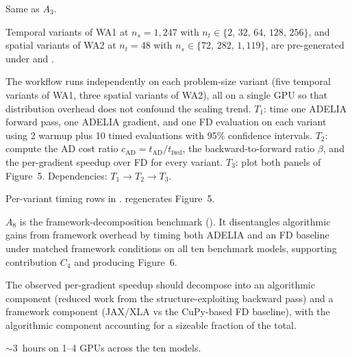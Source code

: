 \documentclass[nonacm,sigconf]{acmart}
\begin{document}
\artin


Same as $A_3$.


Temporal variants of WA1 at $n_s{=}1{,}247$
with $n_t \in \{2,\,32,\,64,\,128,\,256\}$,
and spatial variants of WA2 at $n_t{=}48$
with $n_s \in \{72,\,282,\,1{,}119\}$,
are pre-generated under 
and .

\artcomp

The workflow runs independently on each problem-size variant
(five temporal variants of WA1, three spatial variants of WA2),
all on a single GPU so that distribution overhead does not
confound the scaling trend.
$T_1$: time one ADELIA forward pass, one ADELIA gradient, and
one FD evaluation on each variant using 2 warmup plus 10 timed
evaluations with 95\% confidence intervals.
$T_2$: compute the AD cost ratio
$c_{\mathrm{AD}} = t_{\mathrm{AD}} / t_{\mathrm{fwd}}$, the
backward-to-forward ratio $\beta$, and the per-gradient speedup
over FD for every variant.
$T_3$: plot both panels of Figure~5.
Dependencies: $T_1 \rightarrow T_2 \rightarrow T_3$.

\artout

Per-variant timing rows in .
 regenerates Figure~5.


\newartifact

\artrel

$A_8$ is the framework-decomposition benchmark
(). It
disentangles algorithmic gains from framework overhead by timing
both ADELIA and an FD baseline under matched framework conditions
on all ten benchmark models, supporting contribution $C_4$ and
producing Figure~6.

\artexp

The observed per-gradient speedup should decompose into an
algorithmic component (reduced work from the structure-exploiting
backward pass) and a framework component (JAX/XLA vs the CuPy-based
FD baseline), with the algorithmic component accounting for a
sizeable fraction of the total.

\arttime

$\sim$3~hours on 1--4 GPUs across the ten models.

\artin

\end{document}
